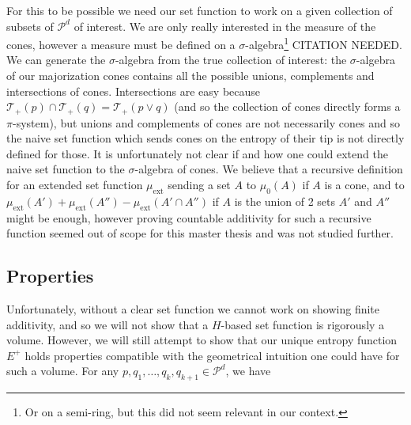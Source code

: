 For this to be possible we need our set function to work on a given collection of subsets of $\mathcal{P}^d$ of interest. We are only really interested in the measure of the cones, however a measure must be defined on a $\sigma$-algebra\footnote{Or on a semi-ring, but this did not seem relevant in our context.} CITATION NEEDED. We can generate the $\sigma$-algebra from the true collection of interest: the $\sigma$-algebra of our majorization cones contains all the possible unions, complements and intersections of cones. Intersections are easy because $\mathcal{T}_+(p) \cap \mathcal{T}_+(q) = \mathcal{T}_+(p \vee q)$ (and so the collection of cones directly forms a $\pi$-system), but unions and complements of cones are not necessarily cones and so the naive set function which sends cones on the entropy of their tip is not directly defined for those. It is unfortunately not clear if and how one could extend the naive set function to the $\sigma$-algebra of cones. We believe that a recursive definition for an extended set function $\mu_{\text{ext}}$ sending a set $A$ to $\mu_0(A)$ if $A$ is a cone, and to $\mu_{\text{ext}}(A') +\mu_{\text{ext}}(A'') - \mu_{\text{ext}}(A' \cap A'')$ if $A$ is the union of 2 sets $A'$ and $A''$ might be enough, however proving countable additivity for such a recursive function seemed out of scope for this master thesis and was not studied further.



\subsection{Properties} \label{sec:unique_entropy_properties}

Unfortunately, without a clear set function we cannot work on showing finite additivity, and so we will not show that a $H$-based set function is rigorously a volume. However, we will still attempt to show that our unique entropy function $E^+$ holds properties compatible with the geometrical intuition one could have for such a volume. For any $p, q_1, \dots, q_k, q_{k+1} \in \mathcal{P}^d$, we have

